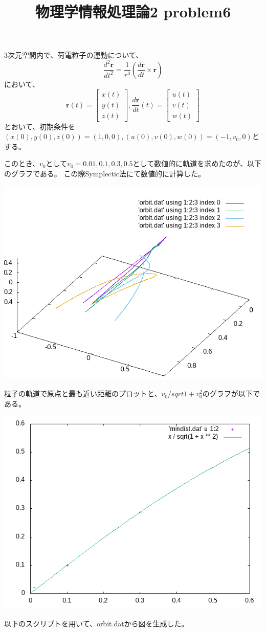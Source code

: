 \documentclass[12pt,a5]{bxjsarticle}
\title{物理学情報処理論2 problem6}
\date{}
\begin{document}
\maketitle

\section{}
3次元空間内で、荷電粒子の運動について、
\[
\frac{d^2\bm{r}}{dt^2} = \frac{1}{r^3}(\frac{d\bm{r}}{dt} \times \bm{r})
\]
において、
\[
\bm{r}(t) = \left[
  \begin{array}{c}
    x(t) \\
    y(t) \\
    z(t)
  \end{array}
\right],
\frac{d\bm{r}}{dt}(t) = \left[
  \begin{array}{c}
    u(t) \\
    v(t) \\
    w(t)
  \end{array}
\right]
\]
とおいて、初期条件を$ (x(0), y(0), z(0)) = (1, 0, 0), (u(0), v(0), w(0)) = (-1, v_0, 0) $とする。

このとき、$ v_0 $として$v_0 = 0.01, 0.1, 0.3, 0.5 $として数値的に軌道を求めたのが、以下のグラフである。
この際Symplectic法にて数値的に計算した。

\includegraphics[width=\linewidth]{orbit.png}

粒子の軌道で原点と最も近い距離のプロットと、$v_0/sqrt{1+v_0^2}$のグラフが以下である。

\includegraphics[width=\linewidth]{min.png}


以下のスクリプトを用いて、orbit.datから図を生成した。

\end{document}

